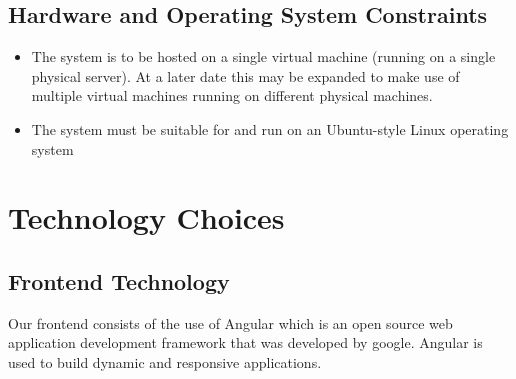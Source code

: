 \documentclass[12pt]{article}
\begin{document}
\subsection{Hardware and Operating System Constraints}
\begin{itemize}
    \item The system is to be hosted on a single virtual machine (running on a single physical server). At a later date this may be expanded to make use of multiple virtual machines running on different physical machines.
    \item The system must be suitable for and run on an Ubuntu-style Linux operating system
\end{itemize}

\newpage

\section{Technology Choices}
\subsection{Frontend Technology}
Our frontend consists of the use of Angular which is an open source web application development framework that was developed by google. Angular is used to build dynamic and responsive applications.
\end{document}
